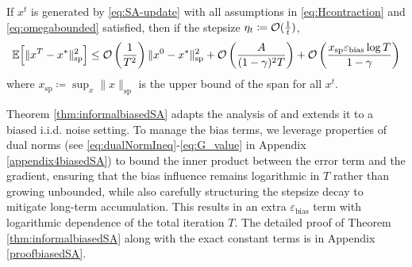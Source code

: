\begin{theorem} \label{thm:informalbiasedSA}
   If $x^t$ is generated by \eqref{eq:SA-update} with all assumptions in \eqref{eq:Hcontraction} and \eqref{eq:omegabounded} satisfied, then if the stepsize $\eta_t \coloneqq \operatorname*{\mathcal{O}}(\frac{1}{t})$,
    \begin{equation} \label{eq:biasedSA}
        \mathbb{E}\Bigl[\|x^T - x^*\|^2_{\mathrm{sp}}\Bigr] \leq  \operatorname*{\mathcal{O}}\left(\frac{1}{T^2}\right)\|x^0 - x^*\|^2_{\mathrm{sp}} + \operatorname*{\mathcal{O}}\left(\frac{A}{(1-\gamma)^2T}\right) +  \operatorname*{\mathcal{O}}\left(\frac{x_{\mathrm{sp}} \varepsilon_{\text{bias}} \log T }{1-\gamma} \right)
    \end{equation}
    where  $x_{\mathrm{sp}} \coloneqq \sup_x \|x\|_{\mathrm{sp}}$ is the upper bound of the span for all $x^t$.
\end{theorem}
Theorem \ref{thm:informalbiasedSA} adapts the analysis of \citep{zhang2021finite} and extends it to a biased i.i.d. noise setting. To manage the bias terms, we leverage properties of dual norms (see \eqref{eq:dualNormIneq}-\eqref{eq:G_value} in Appendix \ref{appendix4biasedSA}) to bound the inner product between the error term and the gradient, ensuring that the bias influence remains logarithmic in 
$T$ rather than growing unbounded, while also carefully structuring the stepsize decay to mitigate long-term accumulation. This results in an extra $\varepsilon_{\mathrm{bias}}$ term with logarithmic dependence of the total iteration $T$. The detailed proof of Theorem \ref{thm:informalbiasedSA} along with the exact constant terms is in Appendix \ref{proofbiasedSA}.
